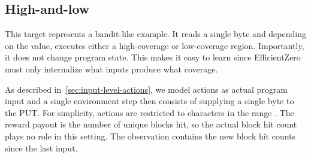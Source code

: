\subsection{High-and-low}\label{sec:target-high-and-low}

This target represents a bandit-like example.
It reads a single byte and depending on the value, executes either a high-coverage
or low-coverage region.
Importantly, it does not change program state.
This makes it easy to learn since EfficientZero must only internalize what inputs
produce what coverage.

As described in~\cref{sec:input-level-actions}, we model actions as actual program input
and a single environment step then consists of supplying a single byte to the PUT.
For simplicity, actions are restricted to characters in the range \code{[A-Z]}.
The reward payout is the number of unique blocks hit, so the actual block hit
count plays no role in this setting.
The observation contains the new block hit counts since the last input.

